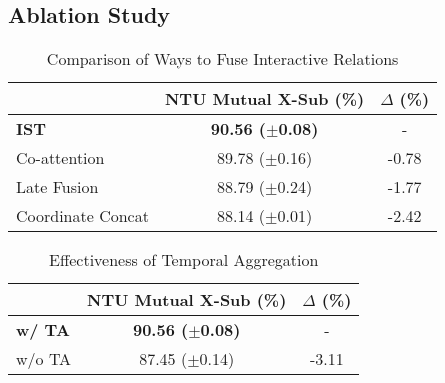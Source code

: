 \documentclass[letterpaper, 10 pt, conference]{ieeeconf}
\begin{document}
\subsection{Ablation Study}

\begin{table}[t]
	\centering
	\caption{Comparison of Ways to Fuse Interactive Relations}
	\vspace{-0.7em}
	\label{ablation1}
\begin{tabular}{l|c|c}
            \hline
                & NTU Mutual X-Sub (\%) & $\Delta$ (\%) \\
		\hline
                \textbf{IST} & \textbf{90.56 ($\pm$0.08)} & - \\
                Co-attention & 89.78 ($\pm$0.16) & -0.78\\
                Late Fusion & 88.79 ($\pm$0.24) & -1.77\\
                Coordinate Concat & 88.14 ($\pm$0.01) & -2.42\\
            \hline
	\end{tabular}
\vspace{-0.8em}
\end{table}

\begin{table}[t]
	\centering
	\caption{Effectiveness of Entity Rearrangements}
	\vspace{-0.7em}
	\label{ablation2}
        \vspace{-1.0em}
\end{table}

\begin{table}[t]
	\centering
	\caption{Effectiveness of Temporal Aggregation}
	\vspace{-0.7em}
	\label{ablation3}
\begin{tabular}{l|c|c}
            \hline
                & NTU Mutual X-Sub (\%) & $\Delta$ (\%)\\
		\hline
                \textbf{w/ TA} & \textbf{90.56 ($\pm$0.08)} & - \\
                w/o TA & 87.45 ($\pm$0.14)& -3.11\\
            \hline
	\end{tabular}
\vspace{-0.8em}
\end{table}
\end{document}
